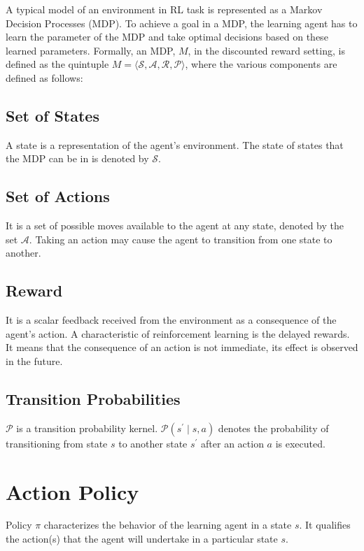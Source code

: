 A typical model of an environment in RL task is represented as a Markov Decision Processes (MDP).
To achieve a goal in a MDP, the learning agent has to learn the parameter of the MDP and take optimal decisions based on these learned parameters.
Formally, an MDP, $M$, in the discounted reward setting, is defined as the quintuple $M = \langle \mathcal{S}, \mathcal{A}, \mathcal{R}, \mathcal{P} \rangle$, where the various components are defined as follows:

\subsection{Set of States}

A state is a representation of the agent's environment.
The state of states that the MDP can be in is denoted by $\mathcal{S}$.

\subsection{Set of Actions}

It is a set of possible moves available to the agent at any state, denoted by the set $\mathcal{A}$.
Taking an action may cause the agent to transition from one state to another.

\subsection{Reward}

It is a scalar feedback received from the environment as a consequence of the agent's action.
A characteristic of reinforcement learning is the delayed rewards.
It means that the consequence of an action is not immediate, its effect is observed in the future.

\subsection{Transition Probabilities}

$\mathcal{P}$ is a transition probability kernel.
$\mathcal{P}(s^\prime \mid s, a)$ denotes the probability of transitioning from state $s$ to another state $s^\prime$ after an action $a$ is executed.

\section{Action Policy}

Policy $\pi$ characterizes the behavior of the learning agent in a state $s$. 
It qualifies the action(s) that the agent will undertake in a particular state $s$.

